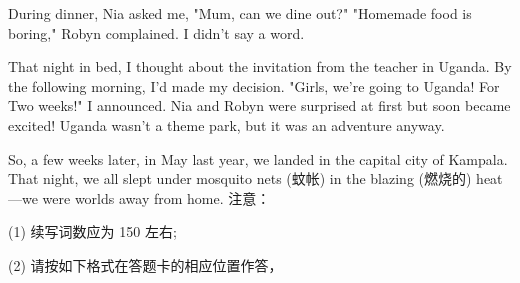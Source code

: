 \documentclass{英语试卷}
\begin{document}
\par During dinner, Nia asked me, "Mum, can we dine out?" "Homemade food is boring," Robyn complained. I didn't say a word.\par
\par That night in bed, I thought about the invitation from the teacher in Uganda. By the following morning, I'd made my decision. "Girls, we're going to Uganda! For Two weeks!" I announced. Nia and Robyn were surprised at first but soon became excited! Uganda wasn't a theme park, but it was an adventure anyway.\par
\par So, a few weeks later, in May last year, we landed in the capital city of Kampala. That night, we all slept under mosquito nets (蚊帐) in the blazing (燃烧的) heat—we were worlds away from home. 注意：\par
\par (1) 续写词数应为 150 左右;\par
\par (2) 请按如下格式在答题卡的相应位置作答，\par
{}
\end{document}

